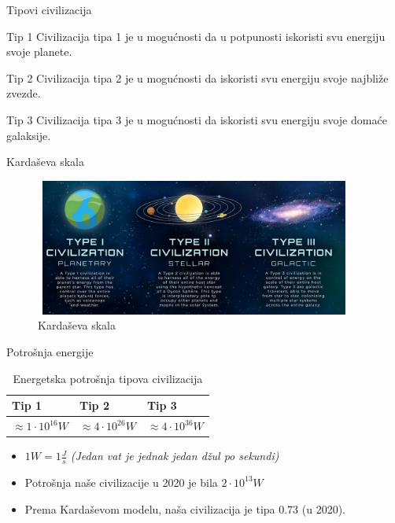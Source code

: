 \documentclass[13pt]{beamer}
\begin{document}
\begin{frame}{Tipovi civilizacija}


\begin{block}{Tip 1}
Civilizacija tipa 1 je u mogućnosti da u potpunosti iskoristi svu energiju svoje planete.
\end{block}

\begin{block}{Tip 2}
Civilizacija tipa 2 je u mogućnosti da iskoristi svu energiju svoje najbliže zvezde.
\end{block}

\begin{block}{Tip 3}
Civilizacija tipa 3 je u mogućnosti da iskoristi svu energiju svoje domaće galaksije.
\end{block}

\end{frame}

\begin{frame}{Kardaševa skala}

    \begin{figure}
        \centering
        \includegraphics[width=10.5cm, height=4.5cm]{images/Kardaseva skala.png}
        \caption{Kardaševa skala}
        \label{fig:Slika}
    \end{figure}
    
\end{frame}

\begin{frame}{Potrošnja energije}

\renewcommand{\arraystretch}{1.5}
\begin{table}[]
    \centering
    \begin{tabular}{ |p{3cm}||p{3cm}|p{3cm}|  }
        \hline
        Tip 1& Tip 2 & Tip 3\\
        \hline
        $\approx 1 \cdot 10^{16} W$  & $\approx 4 \cdot 10^{26} W$ &$\approx 4 \cdot 10^{36} W$ \\
        \hline
    \end{tabular}
    \caption{Energetska potrošnja tipova civilizacija}
    \label{tab:my_label}
\end{table}

\begin{itemize}
    \item $1 W = 1\frac{J}{s}$ \textit{(Jedan vat je jednak jedan džul po sekundi)}
    \item Potrošnja naše civilizacije u 2020 je bila $2 \cdot 10^{13}W$
    \item Prema Kardaševom modelu, naša civilizacija je tipa 0.73 (u 2020).
\end{itemize}

\end{frame}
\end{document}
